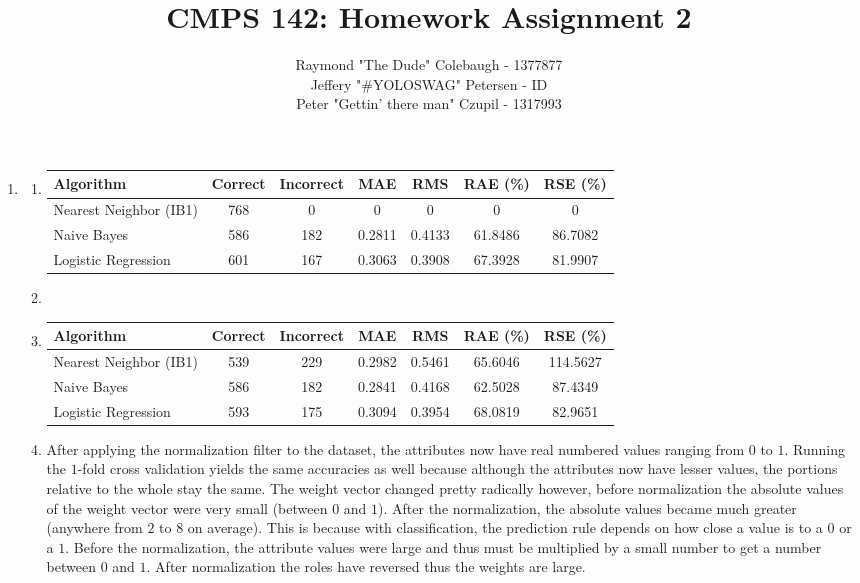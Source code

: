 \documentclass{article}
\title{CMPS 142: Homework Assignment 2}
\author{Raymond "The Dude" Colebaugh - 1377877\\Jeffery "\#YOLOSWAG" Petersen - ID\\Peter "Gettin' there man" Czupil - 1317993}
\begin{document}
\maketitle
\begin{enumerate}
        \item 
            \begin{enumerate}
                \item
                    \begin{tabular}{l | c c c c c c}
                        Algorithm      & Correct & Incorrect & MAE & RMS & RAE (\%) & RSE (\%)\\
                        \hline
                        Nearest Neighbor (IB1) & 768 & 0   & 0      & 0      & 0 & 0 \\
                        Naive Bayes            & 586 & 182 & 0.2811 & 0.4133 & 61.8486 & 86.7082 \\
                        Logistic Regression    & 601 & 167 & 0.3063 & 0.3908 & 67.3928 & 81.9907
                    \end{tabular}
                \item 
                \item
                    \begin{tabular}{l | c c c c c c}
                        Algorithm      & Correct & Incorrect & MAE & RMS & RAE (\%) & RSE (\%)\\
                        \hline
                        Nearest Neighbor (IB1) & 539 & 229 & 0.2982 & 0.5461 & 65.6046 & 114.5627 \\
                        Naive Bayes            & 586 & 182 & 0.2841 & 0.4168 & 62.5028 & 87.4349 \\
                        Logistic Regression    & 593 & 175 & 0.3094 & 0.3954 & 68.0819 & 82.9651
                    \end{tabular}
                \item
                   After applying the normalization filter to the dataset, the attributes now have real                		numbered values ranging from $0$ to $1$.
		Running the $1$-fold cross validation yields the same accuracies as well because 					although the attributes now have lesser values, the portions relative to the whole stay 				the same.
		The weight vector changed pretty radically however, before normalization the absolute 			values of the weight vector were very small (between $0$ and $1$). After the 					normalization, the absolute values became much greater (anywhere from $2$ to $8$ on 			average). This is because with classification, the prediction rule depends on how close a 			value is to a $0$ or a $1$. Before the normalization, the attribute values were large and 			thus must be multiplied by a small number to get a number between $0$ and $1$. After 			normalization the roles have reversed thus the weights are large.

\end{enumerate}
\end{enumerate}
\end{document}
